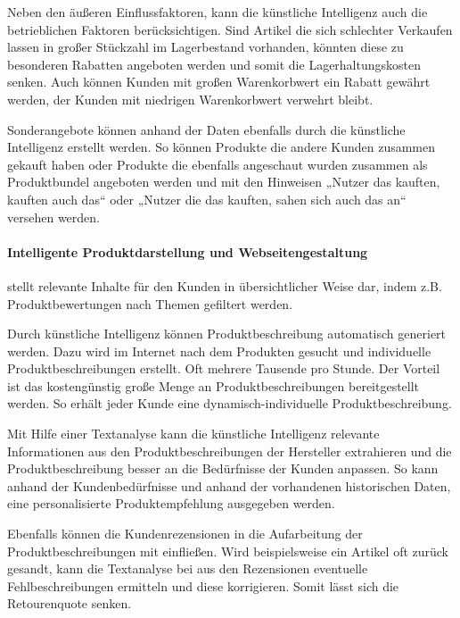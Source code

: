Neben den äußeren Einflussfaktoren, kann die künstliche Intelligenz auch die betrieblichen Faktoren berücksichtigen. Sind Artikel die sich schlechter Verkaufen lassen in großer Stückzahl im  Lagerbestand vorhanden, könnten diese zu besonderen Rabatten angeboten werden und somit die Lagerhaltungskosten senken. Auch können Kunden mit großen Warenkorbwert ein Rabatt gewährt werden, der Kunden mit niedrigen Warenkorbwert verwehrt bleibt.\vspace{0.2cm}

Sonderangebote können anhand der Daten ebenfalls durch die künstliche Intelligenz erstellt werden. So können Produkte die andere Kunden zusammen gekauft haben oder Produkte die ebenfalls angeschaut wurden zusammen als Produktbundel angeboten werden und mit den Hinweisen „Nutzer das kauften, kauften auch das“ oder „Nutzer die das kauften, sahen sich auch das an“ versehen werden.

\paragraph{Intelligente Produktdarstellung und Webseitengestaltung} stellt relevante Inhalte für den Kunden in übersichtlicher Weise dar, indem z.B. Produktbewertungen nach Themen gefiltert werden.\vspace{0.2cm}

Durch künstliche Intelligenz können Produktbeschreibung automatisch generiert werden. Dazu wird im Internet nach dem Produkten gesucht und individuelle Produktbeschreibungen erstellt. Oft mehrere Tausende pro Stunde. Der Vorteil ist das kostengünstig große Menge an Produktbeschreibungen bereitgestellt werden. So erhält jeder Kunde eine dynamisch-individuelle Produktbeschreibung.\vspace{0.2cm}

Mit Hilfe einer Textanalyse kann die künstliche Intelligenz relevante Informationen aus den Produktbeschreibungen der Hersteller extrahieren und die Produktbeschreibung besser an die Bedürfnisse der Kunden anpassen. So kann anhand der Kundenbedürfnisse und anhand der vorhandenen historischen Daten, eine personalisierte Produktempfehlung ausgegeben werden.\vspace{0.2cm}

Ebenfalls können die Kundenrezensionen in die Aufarbeitung der Produktbeschreibungen mit einfließen. Wird beispielsweise ein Artikel oft zurück gesandt, kann die Textanalyse bei  aus den Rezensionen eventuelle Fehlbeschreibungen ermitteln und diese korrigieren. Somit lässt sich die Retourenquote senken.\vspace{0.2cm}


